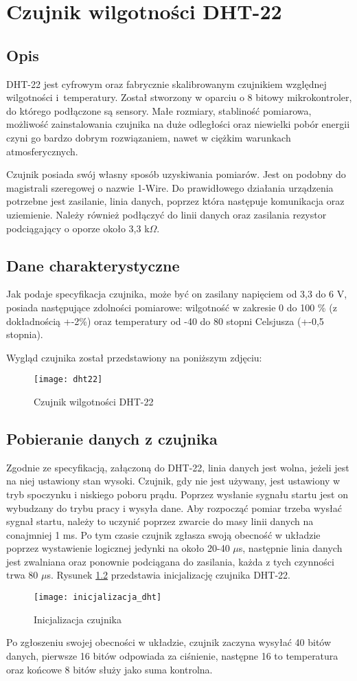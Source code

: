 \chapter{Czujnik wilgotności DHT-22}
\section*{Opis}
DHT-22 jest cyfrowym oraz fabrycznie skalibrowanym czujnikiem względnej wilgotności i~temperatury. Został stworzony w oparciu o 8 bitowy mikrokontroler, do którego podłączone są sensory. Małe rozmiary, stabliność pomiarowa, możliwość zainstalowania czujnika na duże odległości oraz niewielki pobór energii czyni go bardzo dobrym rozwiązaniem, nawet w ciężkim warunkach atmosferycznych.

Czujnik posiada swój własny sposób uzyskiwania pomiarów. Jest on podobny do magistrali szeregowej o nazwie 1-Wire. Do prawidłowego działania urządzenia potrzebne jest zasilanie, linia danych, poprzez która następuje komunikacja oraz uziemienie. Należy również podłączyć do linii danych oraz zasilania rezystor podciągający o oporze około 3,3 k$\Omega$.
\section*{Dane charakterystyczne}
Jak podaje specyfikacja czujnika, może być on zasilany napięciem od 3,3 do 6 V, posiada następujące zdolności pomiarowe: wilgotność w zakresie 0 do 100 \% (z dokładnością +-2\%) oraz temperatury od -40 do 80 stopni Celsjusza (+-0,5 stopnia).

Wygląd czujnika został przedstawiony na poniższym zdjęciu:
\begin{figure}[h]
\centering
\texttt{[image: dht22]}
\caption{Czujnik wilgotności DHT-22}
\label{fig:dht22}
\end{figure}
\section*{Pobieranie danych z czujnika}
Zgodnie ze specyfikacją, załączoną do DHT-22, linia danych jest wolna, jeżeli jest na niej ustawiony stan wysoki. Czujnik, gdy nie jest używany, jest ustawiony w tryb spoczynku i niskiego poboru prądu. Poprzez wysłanie sygnału startu jest on wybudzany do trybu pracy i wysyła dane. Aby rozpocząć pomiar trzeba wysłać sygnał startu, należy to uczynić poprzez zwarcie do masy linii danych na conajmniej 1 ms. Po tym czasie czujnik zgłasza swoją obecność w układzie poprzez wystawienie logicznej jedynki na około 20-40 $\mu$s, następnie linia danych jest zwalniana oraz ponownie podciągana do zasilania, każda z tych czynności trwa 80 $\mu$s. Rysunek \ref{fig:inicjalizacja_dht} przedstawia inicjalizację czujnika DHT-22.
\begin{figure}[h]
\centering
\texttt{[image: inicjalizacja\_dht]}
\caption{Inicjalizacja czujnika}
\label{fig:inicjalizacja_dht}
\end{figure}
Po zgłoszeniu swojej obecności w układzie, czujnik zaczyna wysyłać 40 bitów danych, pierwsze 16 bitów odpowiada za ciśnienie, następne 16 to temperatura oraz końcowe 8 bitów służy jako suma kontrolna.

